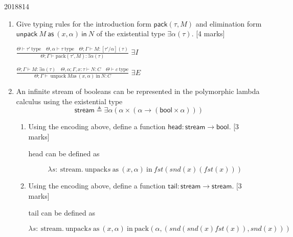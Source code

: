 \documentclass[10pt,\jkfside,a4paper]{article}
\newcommand{\answer}[1]{
    \begin{tcolorbox}[colframe=black, colback=white, sharp corners, boxrule=0.2mm, breakable]
        #1
    \end{tcolorbox}
}
\newcommand{\qmarks}[1]{\hspace*{\fill}[#1]}
\begin{document}
\begin{examquestion}{2018}{8}{14}
    \begin{enumerate}
        \item
            Give typing rules for the introduction form $\mathsf{pack}(\tau, M)$ and
            elimination form $\mathsf{unpack}\ M\ \mathsf{as}\ (x, \alpha)\ \mathsf{in}\ N$
            of the existential type $\exists\alpha(\tau)$. \qmarks{4 marks}

        \answer{
            $\frac{\Theta \vdash \tau' \ \text{type} \quad \Theta, \alpha \vdash \tau \ \text{type} \quad \Theta; \Gamma \vdash M : [\tau' / \alpha](\tau) }{\Theta; \Gamma \vdash \text{pack}(\tau', M) : \exists \alpha(\tau)}$ $\exists I$

            $\frac{\Theta; \Gamma \vdash M : \exists \alpha(\tau) \quad \Theta , \alpha ; \Gamma, x : \tau \vdash N : C \quad \Theta \vdash c \ \text{type}}{\Theta ; \Gamma \vdash \ \text{unpack} \ M \text{as} \ (x, \alpha) \ \text{in} \ N : C}$ $\exists E$
        }

        \item
            An infinite stream of booleans can be represented in the polymorphic lambda
            calculus using the existential type
            \[
                \mathsf{stream} \triangleq \exists\alpha(\alpha \times (\alpha \to (\mathsf{bool} \times \alpha)))
            \]
            \begin{enumerate}
                \item
                    Using the encoding above, define a function
                    $\mathsf{head} : \mathsf{stream} \to \mathsf{bool}$. \qmarks{3 marks}

                    \answer{ 
                        head can be defined as 

                        \[ 
                            \lambda s: \ \text{stream}.\ \text{unpack} s \ \text{as} \ (x, \alpha) \ \text{in} \ fst(snd(x) (fst(x)))
                        \]
                    }

                \item
                    Using the encoding above, define a function
                    $\mathsf{tail} : \mathsf{stream} \to \mathsf{stream}$. \qmarks{3 marks}

                    \answer{ 
                        tail can be defined as 

                        \[ 
                            \lambda s: \ \text{stream}.\ \text{unpack} s \ \text{as} \ (x, \alpha) \ \text{in} \ \text{pack}(\alpha, (snd(snd(x) fst(x)), snd(x)))
                        \]
                    }


\end{enumerate}
\end{enumerate}
\end{examquestion}
\end{document}
